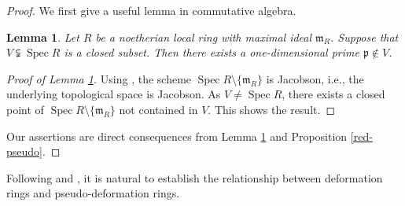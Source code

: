 \documentclass[12pt]{amsart}
\theoremstyle{plain}
\newtheorem{lem}[thm]{Lemma}
\theoremstyle{definition}
\theoremstyle{remark}
\begin{document}
\begin{proof}
	We first give a useful lemma in commutative algebra.
	
	\begin{lem}\label{Jacobon}
		Let $R$ be a noetherian local ring with maximal ideal $\mathfrak{m}_R$. Suppose that $V \subsetneqq \operatorname{Spec} R$ is a closed subset. Then there exists a one-dimensional prime $\mathfrak{p} \notin V$.
	\end{lem}
	
	\begin{proof}[Proof of Lemma \ref{Jacobon}]
		Using \cite[Lemma 28.6.4]{stacks-project}, the scheme $\operatorname{Spec} R \setminus\{\mathfrak{m}_R\}$ is Jacobson, i.e., the underlying topological space is Jacobson. As $V \ne \operatorname{Spec} R$, there exists a closed point of $\operatorname{Spec} R \setminus\{\mathfrak{m}_R\}$ not contained in $V$. This shows the result.
	\end{proof}
	
	Our assertions are direct consequences from Lemma \ref{Jacobon} and Proposition \ref{red-pseudo}.
\end{proof}

Following \cite{skinner1999residually} and \cite{pan2022fontaine}, it is natural to establish the relationship between deformation rings and pseudo-deformation rings.
\end{document}
